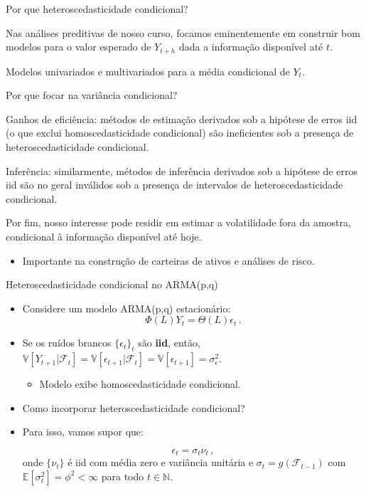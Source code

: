 \documentclass[11pt]{beamer}
\newenvironment{halfwideitemize}{\itemize\addtolength{\itemsep}{0.5em}}{\enditemize}
\newenvironment{halfwideenumerate}{\enumerate\addtolength{\itemsep}{0.5em}}{\endenumerate}
\begin{document}
\begin{frame}{Por que heteroscedasticidade condicional?}
\begin{halfwideitemize}
	\item Nas análises preditivas de nosso curso, focamos eminentemente em construir bom modelos para o valor esperado de $Y_{t+h}$ dada a informação disponível até $t$.
	\begin{halfwideitemize}
		\item Modelos univariados e multivariados para a {\color{blue}média condicional} de $Y_t$.
	\end{halfwideitemize}
		\item Por que focar na {\color{blue}variância condicional}?
	\begin{halfwideenumerate}

		\item Ganhos de eficiência: métodos de estimação derivados sob a hipótese de erros iid (o que exclui homoscedasticidade condicional) são {\color{blue}ineficientes} sob a presença de heteroscedasticidade condicional.
		\item Inferência: similarmente, métodos de inferência derivados sob a hipótese de erros iid são no geral {\color{blue}inválidos} sob a presença de intervalos de heteroscedasticidade condicional.
		\item  Por fim, nosso interesse pode residir em {\color{blue}estimar} a volatilidade fora da amostra, condicional à informação disponível até hoje.
		\begin{itemize}
			\item Importante na construção de carteiras de ativos e análises de risco.
		\end{itemize}
		\end{halfwideenumerate}
\end{halfwideitemize}
\end{frame}

\begin{frame}{Heteroscedasticidade condicional no ARMA(p,q)}
\begin{itemize}
	\item Considere um modelo ARMA(p,q) estacionário:
	$$\Phi(L)Y_t = \Theta(L)\epsilon_t \, .$$
	\item Se os ruídos brancos $\{\epsilon_{t}\}_t$ são \textbf{iid}, então, $\mathbb{V}[Y_{t+1}|\mathcal{F}_t] = \mathbb{V}[\epsilon_{t+1}|\mathcal{F}_t] = \mathbb{V}[\epsilon_{t+1}]  = \sigma^2_{\epsilon}$.
	\begin{itemize}
		\item Modelo exibe homoscedasticidade condicional.
	\end{itemize}
	\item Como incorporar heteroscedasticidade condicional?
		\item Para isso, vamos supor que:
		
		$$\epsilon_t = \sigma_t \nu_t  \, ,$$
		onde $\{\nu_t\}$ é iid  com  média zero e variância unitária e $\sigma_t = g(\mathcal{F}_{t-1})$ com $\mathbb{E}[\sigma^2_{t}] = \phi^2 < \infty$ para todo $t \in \mathbb{N}$.
\end{itemize}
\end{frame}
\end{document}
